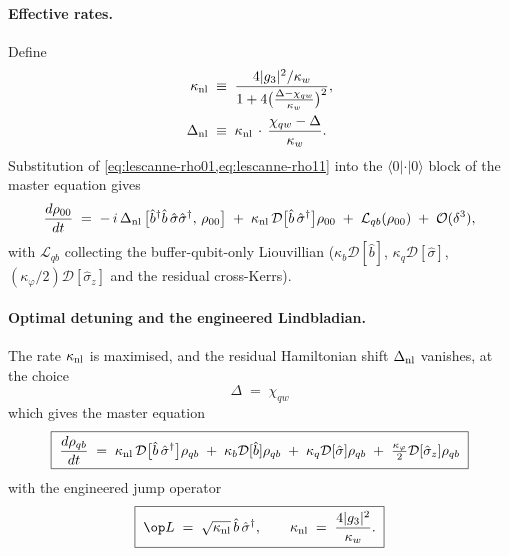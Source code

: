 \paragraph{Effective rates.}
Define
\begin{align}
\label{eq:lescanne-knl}
\kappa_{\rm nl} &\;\equiv\; \frac{4|g_3|^2/\kappa_w}{1+4\bigl(\tfrac{\Delta-\chi_{qw}}{\kappa_w}\bigr)^2},\\
\label{eq:lescanne-Dnl}
\Delta_{\rm nl} &\;\equiv\; \kappa_{\rm nl}\,\cdot\,\frac{\chi_{qw}-\Delta}{\kappa_w}.
\end{align}
Substitution of \cref{eq:lescanne-rho01,eq:lescanne-rho11} into the
$\langle 0|\cdot|0\rangle$ block of the master equation gives
\begin{equation}
\label{eq:lescanne-rho00}
\frac{d\rho_{00}}{dt}
\;=\; -\,i\,\Delta_{\rm nl}\,\bigl[\hat b^\dagger\hat b\,\hat\sigma\hat\sigma^\dagger,\,\rho_{00}\bigr]
\;+\; \kappa_{\rm nl}\,\mathcal D\bigl[\hat b\,\hat\sigma^\dagger\bigr]\rho_{00}
\;+\; \mathcal L_{qb}(\rho_{00})
\;+\; \mathcal O(\delta^3),
\end{equation}
with $\mathcal L_{qb}$ collecting the buffer-qubit-only Liouvillian
($\kappa_b\mathcal D[\hat b]$, $\kappa_q\mathcal D[\hat\sigma]$,
$(\kappa_\varphi/2)\mathcal D[\hat\sigma_z]$ and the residual
cross-Kerrs).

\paragraph{Optimal detuning and the engineered Lindbladian.}
The rate $\kappa_{\rm nl}$ is maximised, and the residual Hamiltonian
shift $\Delta_{\rm nl}$ vanishes, at the choice
\begin{equation}
\label{eq:lescanne-Delta-opt}
\boxed{\;\Delta \;=\; \chi_{qw}\;}
\end{equation}
which gives the master equation
\begin{equation}
\label{eq:lescanne-final-master}
\boxed{\;
\frac{d\rho_{qb}}{dt}
\;=\; \kappa_{\rm nl}\,\mathcal D\bigl[\hat b\,\hat\sigma^\dagger\bigr]\rho_{qb}
\;+\; \kappa_b\mathcal D[\hat b]\rho_{qb}
\;+\; \kappa_q\mathcal D[\hat\sigma]\rho_{qb}
\;+\; \tfrac{\kappa_\varphi}{2}\mathcal D[\hat\sigma_z]\rho_{qb}
\;}
\end{equation}
with the engineered jump operator
\begin{equation}
\label{eq:lescanne-Lop}
\boxed{\;
\op L \;=\; \sqrt{\kappa_{\rm nl}}\,\hat b\,\hat\sigma^\dagger,
\qquad \kappa_{\rm nl} \;=\; \frac{4|g_3|^2}{\kappa_w}.
\;}
\end{equation}

